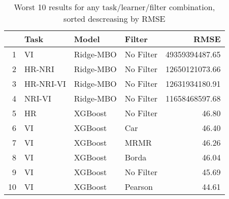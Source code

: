 \begin{table}[ht!]
\centering
\caption{Worst 10 results for any task/learner/filter combination, sorted descreasing by RMSE} 
\label{tab:perf-worst-10}
\begin{tabular}{rlllr}
  \hline
 & Task & Model & Filter & RMSE \\ 
  \hline
1 & VI & Ridge-MBO & No Filter & 49359394487.65 \\ 
  2 & HR-NRI & Ridge-MBO & No Filter & 12650121073.66 \\ 
  3 & HR-NRI-VI & Ridge-MBO & No Filter & 12631934180.91 \\ 
  4 & NRI-VI & Ridge-MBO & No Filter & 11658468597.68 \\ 
  5 & HR & XGBoost & No Filter & 46.80 \\ 
  6 & VI & XGBoost & Car & 46.40 \\ 
  7 & VI & XGBoost & MRMR & 46.26 \\ 
  8 & VI & XGBoost & Borda & 46.04 \\ 
  9 & VI & XGBoost & No Filter & 45.69 \\ 
  10 & VI & XGBoost & Pearson & 44.61 \\ 
   \hline
\end{tabular}
\end{table}
